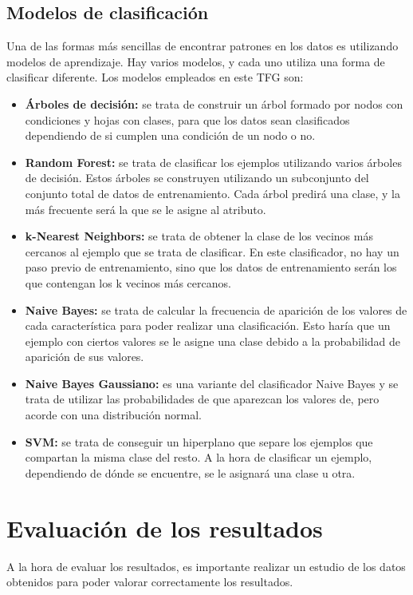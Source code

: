 \subsection{Modelos de clasificación}
Una de las formas más sencillas de encontrar patrones en los datos es utilizando modelos de aprendizaje. Hay varios modelos, y cada uno utiliza una forma de clasificar diferente. Los modelos empleados en este TFG son:
\begin{itemize}
	\item \textbf{Árboles de decisión:} se trata de construir un árbol formado por nodos con condiciones y hojas con clases, para que los datos sean clasificados dependiendo de si cumplen una condición de un nodo o no.
	\item \textbf{Random Forest:} se trata de clasificar los ejemplos utilizando varios árboles de decisión. Estos árboles se construyen utilizando un subconjunto del conjunto total de datos de entrenamiento. Cada árbol predirá una clase, y la más frecuente será la que se le asigne al atributo.
	\item \textbf{k-Nearest Neighbors:} se trata de obtener la clase de los vecinos más cercanos al ejemplo que se trata de clasificar. En este clasificador, no hay un paso previo de entrenamiento, sino que los datos de entrenamiento serán los que contengan los k vecinos más cercanos.
	\item \textbf{Naive Bayes:} se trata de calcular la frecuencia de aparición de los valores de cada característica para poder realizar una clasificación. Esto haría que 
	un ejemplo con ciertos valores se le asigne una clase debido a la probabilidad de aparición de sus valores.
	\item \textbf{Naive Bayes Gaussiano:} es una variante del clasificador Naive Bayes y se trata de utilizar las probabilidades de que aparezcan los valores de, pero acorde con una distribución normal.
	\item \textbf{SVM:} se trata de conseguir un hiperplano que separe los ejemplos que compartan la misma clase del resto. A la hora de clasificar un ejemplo, dependiendo de dónde se encuentre, se le asignará una clase u otra.
\end{itemize}

\section{Evaluación de los resultados}
A la hora de evaluar los resultados, es importante realizar un estudio de los datos obtenidos para poder valorar correctamente los resultados.

